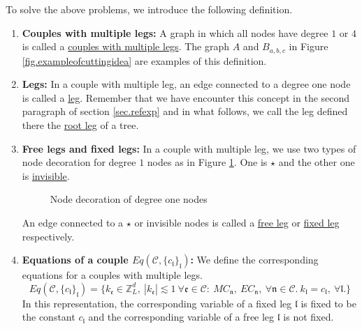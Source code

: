 To solve the above problems, we introduce the following definition.

\begin{defn}\label{def.couplemultileg}
\begin{enumerate}
    \item \textbf{Couples with multiple legs:} A graph in which all nodes have degree $1$ or $4$ is called a \underline{couples with multiple legs}. The graph $A$ and $B_{a,b,c}$ in Figure \ref{fig.exampleofcuttingidea} are examples of this definition.
    \item \textbf{Legs:} In a couple with multiple leg, an edge connected to a degree one node is called a \underline{leg}. Remember that we have encounter this concept in the second paragraph of section \ref{sec.refexp} and in what follows, we call the leg defined there the \underline{root leg} of a tree.   
    \item \textbf{Free legs and fixed legs:} In a couple with multiple leg, we use two types of node decoration for degree $1$ nodes as in Figure \ref{fig.decorationdegreeone}. One is $\star$ and the other one is \underline{invisible}. 
    \begin{figure}[H]
    \centering
        \caption{Node decoration of degree one nodes}
        \label{fig.decorationdegreeone}
    \end{figure}
    An edge connected to a $\star$ or invisible nodes is called a \underline{free leg} or \underline{fixed leg} respectively. 
    
    
    \item \textbf{Equations of a couple $Eq(\mathcal{C},\{c_{\mathfrak{l}}\}_{\mathfrak{l}})$:} We define the corresponding equations for a couples with multiple legs.
    \begin{equation}\label{eq.Eq(C,c)}
        Eq(\mathcal{C},\{c_{\mathfrak{l}}\}_{\mathfrak{l}})=\{k_{\mathfrak{e}}\in \mathbb{Z}^d_L,\ |k_{\mathfrak{e}}|\lesssim 1\ \forall \mathfrak{e}\in \mathcal{C}:\ MC_{\mathfrak{n}},\  EC_{\mathfrak{n}},\ \forall \mathfrak{n}\in \mathcal{C}.\ k_{\mathfrak{l}}=c_{\mathfrak{l}},\ \forall \mathfrak{l}.\}   
    \end{equation}
    In this representation, the corresponding variable of a fixed leg $\mathfrak{l}$ is fixed to be the constant $c_{\mathfrak{l}}$ and the corresponding variable of a free leg $\mathfrak{l}$ is not fixed.
\end{enumerate}
\end{defn}

